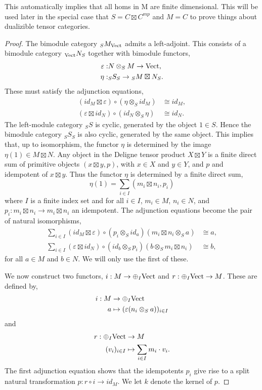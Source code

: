 \documentclass{amsart}
\begin{document}
{\color{CSPcolor} This automatically implies that all homs in M are finite dimensional. 
This will be used later in the special case that $S = C \boxtimes C^{mp}$ and $M=C$ to prove things about  dualizible tensor categories.}

\begin{proof}
	The bimodule category ${}_S M_{\mathrm{Vect}}$ admits a left-adjoint. This consists of a bimodule category ${}_{\mathrm{Vect}}N_S$ together with bimodule functors,
	\begin{align*}
		\varepsilon: & N \otimes_S M \to \mathrm{Vect}, \\
		\eta: & {}_S S_S \to {}_S M \boxtimes N_S. 
	\end{align*}
	These must satisfy the adjunction equations,
	\begin{align*}
		(id_M \boxtimes \varepsilon) \circ (\eta \otimes_S id_M) &\cong id_M, \\
		(\varepsilon \boxtimes id_N) \circ (id_N \otimes_S \eta) & \cong id_N.
	\end{align*}
	The left-module category ${}_S S$ is cyclic, generated by the object $1 \in S$. Hence the bimodule category ${}_S S_S$ is also cyclic, generated by the same object. This implies that, up to isomorphism, the functor $\eta$ is determined by the image $\eta(1) \in M \boxtimes N $. Any object in the Deligne tensor product $X \boxtimes Y$ is a finite direct sum of primitive objects $(x \boxtimes y, p)$, with $x \in X$ and $y \in Y$, and $p$ and idempotent of $x \boxtimes y$.
	 Thus the functor $\eta$ is determined by a finite direct sum,
	\begin{equation*}
		\eta(1) = \sum_{i \in I} (m_i \boxtimes n_i , p_i)
	\end{equation*} 
	where $I$ is a finite index set and for all $i \in I$,  $m_i \in M$, $n_i \in N$, and $p_i: m_i \boxtimes n_i \to m_i \boxtimes n_i$ an idempotent. The adjunction equations become the pair of natural isomorphisms,
	\begin{align*}
		\sum_{i \in I}   (id_M \boxtimes \varepsilon) \circ (p_i \otimes_S id_a) (m_i \boxtimes n_i \otimes_S a) & \cong a, \\
		\sum_{i \in I}   ( \varepsilon \boxtimes id_N) \circ (id_b \otimes_S p_i) (b \otimes_S m_i \boxtimes  n_i) & \cong b,
	\end{align*}
	for all $a \in M$ and $b \in N$. We will only use the first of these. 
	
We now construct two functors, $i: M \to \oplus_I \mathrm{Vect}$ and $r: \oplus_I \mathrm{Vect} \to M$. These are defined by,
\begin{align*}
	i: M & \to \oplus_I \mathrm{Vect} \\
	a & \mapsto (\varepsilon(n_i \otimes_S a) )_{i \in I}
\end{align*}	
and 
\begin{align*}
	r: \oplus_I \mathrm{Vect} & \to M \\
	(v_i)_{i \in I} & \mapsto \sum_{i \in I} m_i \cdot v_i.
\end{align*}	
The first adjunction equation shows that the idempotents $p_i$ give rise to a split natural transformation $p: r \circ i \to id_M$. We let $k$ denote the kernel of $p$.
\end{proof}
\end{document}
